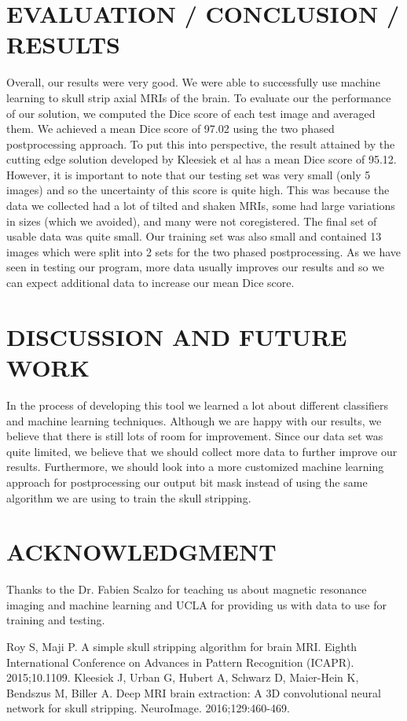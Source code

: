 \documentclass[letterpaper, 10 pt, conference]{ieeeconf}
\begin{document}
\section{EVALUATION / CONCLUSION / RESULTS}
Overall, our results were very good. We were able to successfully use machine learning to skull strip axial MRIs of the brain. To evaluate our the performance of our solution, we computed the Dice score of each test image and averaged them. We achieved a mean Dice score of 97.02 using the two phased postprocessing approach. To put this into perspective, the result attained by the cutting edge solution developed by Kleesiek et al has a mean Dice score of 95.12. However, it is important to note that our testing set was very small (only 5 images) and so the uncertainty of this score is quite high. This was because the data we collected had a lot of tilted and shaken MRIs, some had large variations in sizes (which we avoided), and many were not coregistered. The final set of usable data was quite small. Our training set was also small and contained 13 images which were split into 2 sets for the two phased postprocessing. As we have seen in testing our program, more data usually improves our results and so we can expect additional data to increase our mean Dice score.

\section{DISCUSSION AND FUTURE WORK}
In the process of developing this tool we learned a lot about different classifiers and machine learning techniques. Although we are happy with our results, we believe that there is still lots of room for improvement. Since our data set was quite limited, we believe that we should collect more data to further improve our results. Furthermore, we should look into a more customized machine learning approach for postprocessing our output bit mask instead of using the same algorithm we are using to train the skull stripping.

\section*{ACKNOWLEDGMENT}

Thanks to the Dr. Fabien Scalzo for teaching us about magnetic resonance imaging and machine learning and UCLA for providing us with data to use for training and testing.

\begin{thebibliography}{99}

 Roy S, Maji P. A simple skull stripping algorithm for brain MRI. Eighth International Conference on Advances in Pattern Recognition (ICAPR). 2015;10.1109.
 Kleesiek J, Urban G, Hubert A, Schwarz D, Maier-Hein K, Bendszus M, Biller A. Deep MRI brain extraction: A 3D convolutional neural network for skull stripping. NeuroImage. 2016;129:460-469.

\end{thebibliography}
\end{document}
